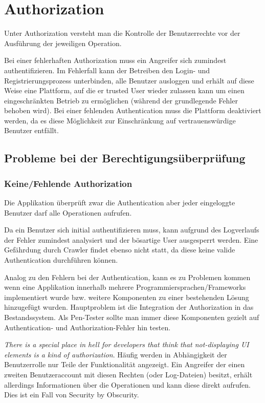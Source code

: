 \chapter{Authorization}

Unter Authorization versteht man die Kontrolle der Benutzerrechte vor der Ausführung der jeweiligen Operation.

Bei einer fehlerhaften Authorization muss ein Angreifer sich zumindest authentifizieren. Im Fehlerfall kann der Betreiben den Login- und Registrierungsprozess unterbinden, alle Benutzer ausloggen und erhält auf diese Weise eine Plattform, auf die er trusted User wieder zulassen kann um einen eingeschränkten Betrieb zu ermöglichen (während der grundlegende Fehler behoben wird). Bei einer fehlenden Authentication muss die Plattform deaktiviert werden, da es diese Möglichkeit zur Einschränkung auf vertrauenswürdige Benutzer entfällt.

\section{Probleme bei der Berechtigungsüberprüfung}

\subsection{Keine/Fehlende Authorization}

Die Applikation überprüft zwar die Authentication aber jeder eingeloggte Benutzer darf alle Operationen aufrufen.

Da ein Benutzer sich initial authentifizieren muss, kann aufgrund des Logverlaufs der Fehler zumindest analysiert und der bösartige User ausgesperrt werden. Eine Gefährdung durch Crawler findet ebenso nicht statt, da diese keine valide Authentication durchführen können.

Analog zu den Fehlern bei der Authentication, kann es zu Problemen kommen wenn eine Applikation innerhalb mehrere Programmiersprachen/Frameworks implementiert wurde bzw. weitere Komponenten zu einer bestehenden Lösung hinzugefügt wurden. Hauptproblem ist die Integration der Authorization in das Bestandssystem. Als Pen-Tester sollte man immer diese Komponenten gezielt auf Authentication- und Authorization-Fehler hin testen.

\textit{There is a special place in hell for developers that think that not-displaying UI elements is a kind of authorization}. Häufig werden in Abhängigkeit der Benutzerrolle nur Teile der Funktionalität angezeigt. Ein Angreifer der einen zweiten Benutzeraccount mit diesen Rechten (oder Log-Dateien) besitzt, erhält allerdings Informationen über die Operationen und kann diese direkt aufrufen. Dies ist ein Fall von Security by Obscurity.

